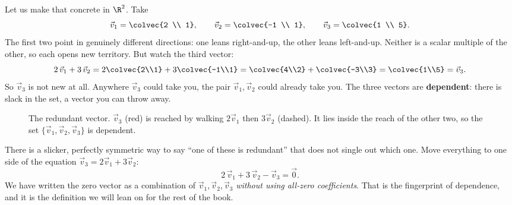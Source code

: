 Let us make that concrete in $\R^2$. Take
\[
  \vec{v}_1 = \colvec{2 \\ 1}, \qquad
  \vec{v}_2 = \colvec{-1 \\ 1}, \qquad
  \vec{v}_3 = \colvec{1 \\ 5}.
\]
The first two point in genuinely different directions: one leans right-and-up,
the other leans left-and-up. Neither is a scalar multiple of the other, so each
opens new territory. But watch the third vector:
\[
  2\,\vec{v}_1 + 3\,\vec{v}_2
  = 2\colvec{2\\1} + 3\colvec{-1\\1}
  = \colvec{4\\2} + \colvec{-3\\3}
  = \colvec{1\\5}
  = \vec{v}_3 .
\]
So $\vec{v}_3$ is not new at all. Anywhere $\vec{v}_3$ could take you, the pair
$\vec{v}_1, \vec{v}_2$ could already take you. The three vectors are
\textbf{dependent}: there is slack in the set, a vector you can throw away.

\begin{figure}[H]
\centering
{}
\caption{The redundant vector. $\vec{v}_3$ (red) is reached by walking
$2\vec{v}_1$ then $3\vec{v}_2$ (dashed). It lies inside the reach of the other
two, so the set $\{\vec{v}_1,\vec{v}_2,\vec{v}_3\}$ is dependent.}
\label{ch14:fig-redundant}
\end{figure}

There is a slicker, perfectly symmetric way to say ``one of these is redundant''
that does not single out which one. Move everything to one side of the equation
$\vec{v}_3 = 2\vec{v}_1 + 3\vec{v}_2$:
\[
  2\,\vec{v}_1 + 3\,\vec{v}_2 - \vec{v}_3 = \vec{0}.
\]
We have written the zero vector as a combination of $\vec{v}_1,\vec{v}_2,
\vec{v}_3$ \emph{without using all-zero coefficients}. That is the fingerprint of
dependence, and it is the definition we will lean on for the rest of the book.

